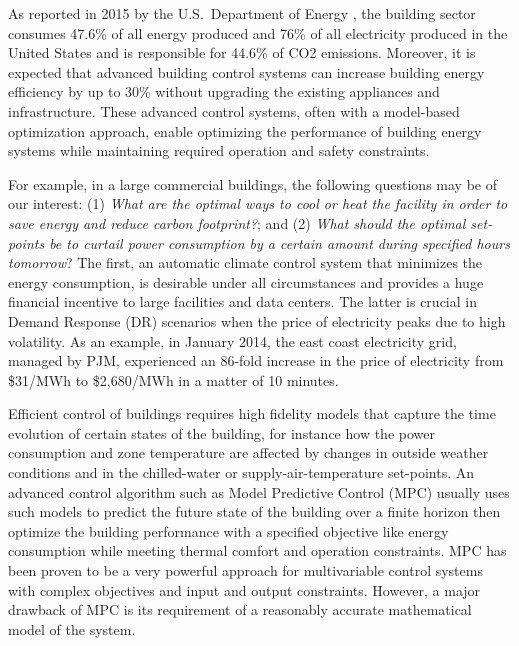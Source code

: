 As reported in 2015 by the U.S.\ Department of Energy \cite{doe2015quadrennial}, the building sector consumes 47.6\% of all energy produced and 76\% of all electricity produced in the United States and is responsible for 44.6\% of CO2 emissions.
Moreover, it is expected that advanced building control systems can increase building energy efficiency by up to 30\% without upgrading the existing appliances and infrastructure.
These advanced control systems, often with a model-based optimization approach, enable optimizing the performance of building energy systems while maintaining required operation and safety constraints.

For example, in a large commercial buildings, the following questions may be of our interest:
(1) \emph{What are the optimal ways to cool or heat the facility in order to save energy and reduce carbon footprint?}; and
(2) \emph{What should the optimal set-points be to curtail power consumption by a certain amount during specified hours tomorrow}?
The first, an automatic climate control system that minimizes the energy consumption, is desirable under all circumstances and provides a huge financial incentive to large facilities and data centers.
The latter is crucial in Demand Response (DR) scenarios when the price of electricity peaks due to high volatility.
As an example, in January 2014, the east coast electricity grid, managed by PJM, experienced an 86-fold increase in the price of electricity from \$31/MWh to \$2,680/MWh in a matter of 10 minutes.

Efficient control of buildings requires high fidelity models that capture the time evolution of certain states %
of the building, for instance how the power consumption and zone temperature are affected by changes in outside weather conditions and in the chilled-water or supply-air-temperature set-points.
An advanced control algorithm such as Model Predictive Control (MPC) usually uses such models to predict the future state of the building over a finite horizon then optimize the building performance with a specified objective like energy consumption while meeting thermal comfort and operation constraints.
MPC has been proven to be a very powerful approach for multivariable control systems with complex objectives and input and output constraints.
However, a major drawback of MPC is its requirement of a reasonably accurate mathematical model of the system.

